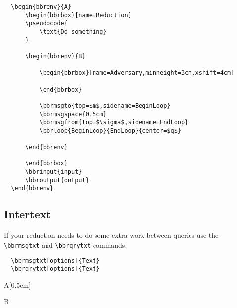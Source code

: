 \documentclass[a4paper]{report}
\begin{document}
  \begin{lstlisting}
  \begin{bbrenv}{A}
	  \begin{bbrbox}[name=Reduction]
	  \pseudocode{
		  \text{Do something} 
	  }
  
	  \begin{bbrenv}{B}
  
		  \begin{bbrbox}[name=Adversary,minheight=3cm,xshift=4cm]
  
		  \end{bbrbox}
		  
		  \bbrmsgto{top=$m$,sidename=BeginLoop}
		  \bbrmsgspace{0.5cm}
		  \bbrmsgfrom{top=$\sigma$,sidename=EndLoop}
		  \bbrloop{BeginLoop}{EndLoop}{center=$q$}
  
	  \end{bbrenv}
  
	  \end{bbrbox}
	  \bbrinput{input}
	  \bbroutput{output}
  \end{bbrenv}
  \end{lstlisting}
  
  \subsection{Intertext}
  
  If your reduction needs to do some extra work between queries use the \lstinline$\bbrmsgtxt$
  and \lstinline$\bbrqrytxt$ commands.
  \begin{lstlisting}
  \bbrmsgtxt[options]{Text}
  \bbrqrytxt[options]{Text}
  \end{lstlisting}
  
  \begin{bbrenv}[1cm]{A}[0.5cm]
	  \begin{bbrbox}[name=Reduction]
  
	  \begin{bbrenv}{B}
  
		  \begin{bbrbox}[name=Adversary,minheight=3cm,xshift=4cm]
  
		  \end{bbrbox}
		  
  
  
	  \end{bbrenv}
  
	  \end{bbrbox}
  \end{bbrenv}
  
\end{document}
